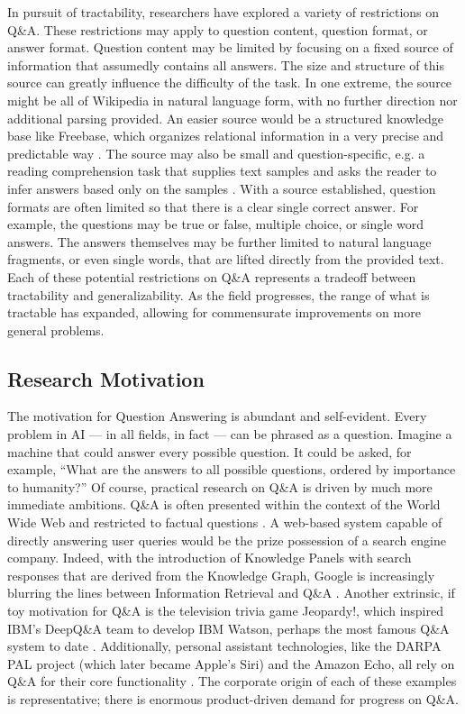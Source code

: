 In pursuit of tractability, researchers have explored a variety of restrictions on Q\&A. These restrictions may apply to question content, question format, or answer format. Question content may be limited by focusing on a fixed source of information that assumedly contains all answers. The size and structure of this source can greatly influence the difficulty of the task. In one extreme, the source might be all of Wikipedia in natural language form, with no further direction nor additional parsing provided. An easier source would be a structured knowledge base like Freebase, which organizes relational information in a very precise and predictable way \citep{bollacker2008freebase}. The source may also be small and question-specific, e.g. a reading comprehension task that supplies text samples and asks the reader to infer answers based only on the samples \citep{richardson2013mctest}. With a source established, question formats are often limited so that there is a clear single correct answer. For example, the questions may be true or false, multiple choice, or single word answers. The answers themselves may be further limited to natural language fragments, or even single words, that are lifted directly from the provided text. Each of these potential restrictions on Q\&A represents a tradeoff between tractability and generalizability. As the field progresses, the range of what is tractable has expanded, allowing for commensurate improvements on more general problems.

\subsection{Research Motivation}

The motivation for Question Answering is abundant and self-evident. Every problem in AI --- in all fields, in fact --- can be phrased as a question. Imagine a machine that could answer every possible question. It could be asked, for example, ``What are the answers to all possible questions, ordered by importance to humanity?'' Of course, practical research on Q\&A is driven by much more immediate ambitions. Q\&A is often presented within the context of the World Wide Web and restricted to factual questions \citep{cucerzan2005factoid, ravichandran2002learning, kwok2001scaling}. A web-based system capable of directly answering user queries would be the prize possession of a search engine company. Indeed, with the introduction of Knowledge Panels with search responses that are derived from the Knowledge Graph, Google is increasingly blurring the lines between Information Retrieval and Q\&A \citep{singhal2012introducing}. Another extrinsic, if toy motivation for Q\&A is the television trivia game Jeopardy!, which inspired IBM's DeepQ\&A team to develop IBM Watson, perhaps the most famous Q\&A system to date \citep{ferrucci2012introduction}. Additionally, personal assistant technologies, like the DARPA PAL project (which later became Apple's Siri) and the Amazon Echo, all rely on Q\&A for their core functionality \citep{aron2011innovative, tsiao2007natural}. The corporate origin of each of these examples is representative; there is enormous product-driven demand for progress on Q\&A.

